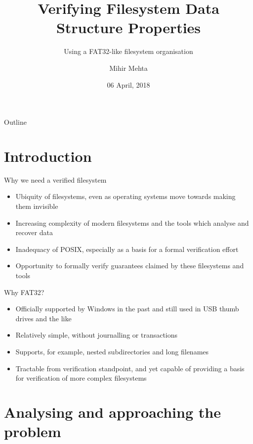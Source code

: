 \documentclass{beamer}
\title{Verifying Filesystem Data Structure Properties}
\subtitle{Using a FAT32-like filesystem organisation}
\author{Mihir Mehta}
\institute{
  Department of Computer Science\\
  University of Texas at Austin\\[1ex]
  \texttt{mihir@cs.utexas.edu}
}
\date{06 April, 2018}
\begin{document}
\begin{frame}[plain]
  \titlepage
\end{frame}

\begin{frame}{Outline}
  \tableofcontents
\end{frame}


\section{Introduction}

\begin{frame}{Why we need a verified filesystem}
  \begin{itemize}
  \item Ubiquity of filesystems, even as operating systems move
    towards making them invisible
  \item Increasing complexity of modern filesystems and the tools
    which analyse and recover data
  \item Inadequacy of POSIX, especially as a basis for a formal
    verification effort
  \item Opportunity to formally verify guarantees claimed by these
    filesystems and tools
  \end{itemize}
\end{frame}

\begin{frame}{Why FAT32?}
  \begin{itemize}
  \item Officially supported by Windows in the past and still used in USB
    thumb drives and the like
  \item Relatively simple, without journalling or transactions
  \item Supports, for example, nested subdirectories and long filenames
  \item Tractable from verification standpoint, and yet capable of
    providing a basis for verification of more complex filesystems
  \end{itemize}
\end{frame}

\section{Analysing and approaching the problem}
\end{document}
